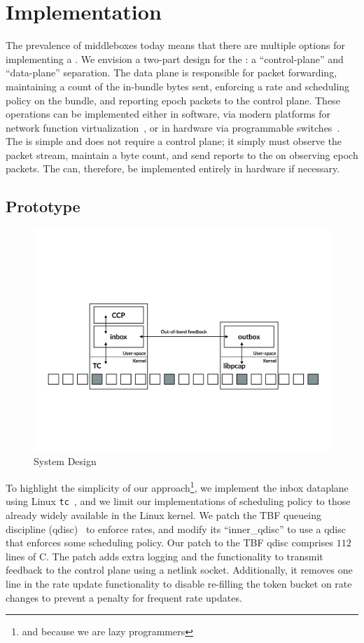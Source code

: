 \section{Implementation}\label{s:impl}

The prevalence of middleboxes today means that there are multiple options for implementing a \name.
We envision a two-part design for the \inbox: a ``control-plane'' and ``data-plane'' separation.
The data plane is responsible for packet forwarding, maintaining a count of the in-bundle bytes sent, enforcing a rate and scheduling policy on the bundle, and reporting epoch packets to the control plane.
These operations can be implemented either in software, via modern platforms for network function virtualization~\cite{bess, click, mos, netbricks}, or in hardware via programmable switches~\cite{p4}.
The \outbox is simple and does not require a control plane; it simply must observe the packet stream, maintain a byte count, and send reports to the \inbox on observing epoch packets.
The \outbox can, therefore, be implemented entirely in hardware if necessary.

\subsection{Prototype}\label{s:impl:prototype}
\begin{figure}
    \centering
    \includegraphics[width=2\columnwidth]{img/bundler-diagram}
    \caption{\name System Design}\label{fig:bundler}
\end{figure}
To highlight the simplicity of our approach\footnote{and because we are lazy programmers}, we implement the inbox dataplane using Linux \texttt{tc}~\cite{tc}, and we limit our implementations of scheduling policy to those already widely available in the Linux kernel.
We patch the TBF queueing discipline (qdisc)~\cite{tbf} to enforce rates, and modify its ``inner\_qdisc'' to use a qdisc that enforces some scheduling policy.
Our patch to the TBF qdisc comprises $112$ lines of C.
The patch adds extra logging and the functionality to transmit feedback to the control plane using a netlink socket. 
Additionally, it removes one line in the rate update functionality to disable re-filling the token bucket on rate changes to prevent a penalty for frequent rate updates.

